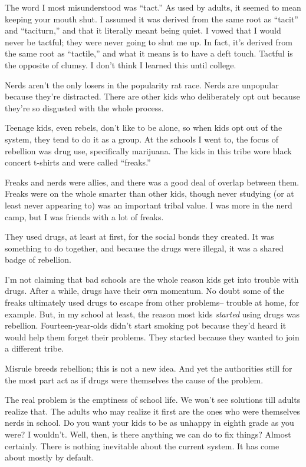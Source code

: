 The word I most misunderstood was ``tact.'' As used by adults, it seemed
to mean keeping your mouth shut. I assumed it was derived from the same
root as ``tacit'' and ``taciturn,'' and that it literally meant being
quiet. I vowed that I would never be tactful; they were never going to
shut me up. In fact, it's derived from the same root as ``tactile,'' and
what it means is to have a deft touch. Tactful is the opposite of
clumsy. I don't think I learned this until college.

Nerds aren't the only losers in the popularity rat race. Nerds are
unpopular because they're distracted. There are other kids who
deliberately opt out because they're so disgusted with the whole
process.

Teenage kids, even rebels, don't like to be alone, so when kids opt out
of the system, they tend to do it as a group. At the schools I went to,
the focus of rebellion was drug use, specifically marijuana. The kids in
this tribe wore black concert t-shirts and were called ``freaks.''

Freaks and nerds were allies, and there was a good deal of overlap
between them. Freaks were on the whole smarter than other kids, though
never studying (or at least never appearing to) was an important tribal
value. I was more in the nerd camp, but I was friends with a lot of
freaks.

They used drugs, at least at first, for the social bonds they created.
It was something to do together, and because the drugs were illegal, it
was a shared badge of rebellion.

I'm not claiming that bad schools are the whole reason kids get into
trouble with drugs. After a while, drugs have their own momentum. No
doubt some of the freaks ultimately used drugs to escape from other
problems-- trouble at home, for example. But, in my school at least, the
reason most kids \emph{started} using drugs was rebellion.
Fourteen-year-olds didn't start smoking pot because they'd heard it
would help them forget their problems. They started because they wanted
to join a different tribe.

Misrule breeds rebellion; this is not a new idea. And yet the
authorities still for the most part act as if drugs were themselves the
cause of the problem.

The real problem is the emptiness of school life. We won't see solutions
till adults realize that. The adults who may realize it first are the
ones who were themselves nerds in school. Do you want your kids to be as
unhappy in eighth grade as you were? I wouldn't. Well, then, is there
anything we can do to fix things? Almost certainly. There is nothing
inevitable about the current system. It has come about mostly by
default.

